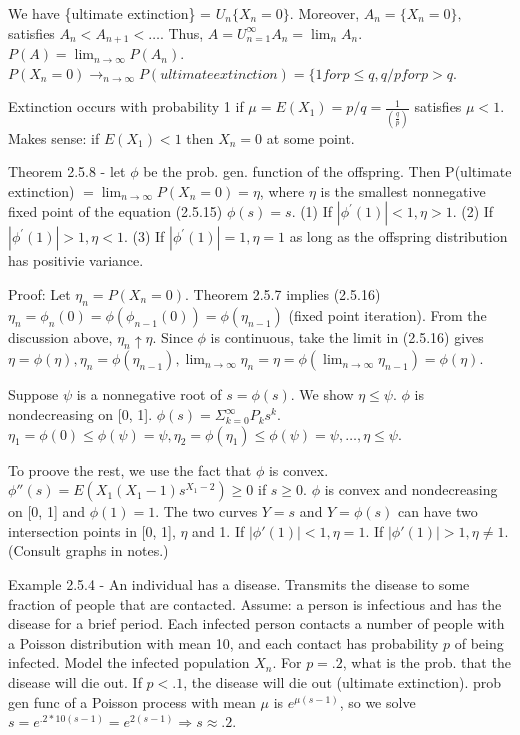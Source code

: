 \documentclass{article}
\begin{document}
We have \{ultimate extinction\} = $U_n \{X_n = 0\}$. Moreover, $A_n = \{X_n=0\},$ satisfies $A_n < A_{n+1} < \dots$. Thus, $A = U_{n=1}^{\infty} A_n = \lim_n A_n$. $P(A) = \lim_{n \rightarrow \infty} P(A_n)$. $P(X_n=0) \rightarrow_{n \rightarrow \infty} P(ultimate extinction) = \{ 1 for p \le q, q/p for p > q$.

Extinction occurs with probability 1 if $\mu = E(X_1) = p/q = \frac{1}{(\frac{q}{p})}$ satisfies $\mu < 1$. Makes sense: if $E(X_1) < 1$ then $X_n = 0$ at some point.

Theorem 2.5.8 - let $\phi$ be the prob. gen. function of the offspring. Then P(ultimate extinction) $= \lim_{n \rightarrow \infty} P(X_n = 0) = \eta$, where $\eta$ is the smallest nonnegative fixed point of the equation (2.5.15) $\phi(s) = s$. (1) If $|\phi^\prime (1)| < 1, \eta > 1$. (2) If $|\phi^\prime(1)| > 1, \eta < 1$. (3) If $|\phi^\prime(1)| = 1, \eta = 1$ as long as the offspring distribution has positivie variance.

Proof: Let $\eta_n = P(X_n=0)$. Theorem 2.5.7 implies (2.5.16) $\eta_n = \phi_n(0) = \phi(\phi_{n-1}(0)) = \phi(\eta_{n-1})$ (fixed point iteration). From the discussion above, $\eta_n \uparrow \eta$. Since $\phi$ is continuous, take the limit in (2.5.16) gives $\eta = \phi(\eta), \eta_n = \phi(\eta_{n-1}), \lim_{n \rightarrow \infty} \eta_n = \eta = \phi(\lim_{n \rightarrow \infty} \eta_{n-1}) = \phi(\eta)$.

Suppose $\psi$ is a nonnegative root of $s = \phi(s)$. We show $\eta \le \psi$. $\phi$ is nondecreasing on [0, 1]. $\phi(s) = \Sigma_{k=0}^{\infty} P_k s^k$. $\eta_1 = \phi(0) \le \phi(\psi) = \psi, \eta_2 = \phi(\eta_1) \le \phi(\psi) = \psi, \dots, \eta \le \psi$.

To proove the rest, we use the fact that $\phi$ is convex. $\phi''(s) = E(X_1(X_1-1)s^{X_1-2}) \ge 0$ if $s \ge 0$. $\phi$ is convex and nondecreasing on [0, 1] and $\phi(1) = 1$. The two curves $Y=s$ and $Y=\phi(s)$ can have two intersection points in [0, 1], $\eta$ and 1. If $|\phi'(1)| < 1, \eta = 1$. If $|\phi'(1)| > 1, \eta \ne 1$. (Consult graphs in notes.)

Example 2.5.4 - An individual has a disease. Transmits the disease to some fraction of people that are contacted. Assume: a person is infectious and has the disease for a brief period. Each infected person contacts a number of people with a Poisson distribution with mean 10, and each contact has probability $p$ of being infected. Model the infected population $X_n$. For $p = .2$, what is the prob. that the disease will die out. If $p < .1$, the disease will die out (ultimate extinction). prob gen func of a Poisson process with mean $\mu$ is $e^{\mu(s-1)}$, so we solve $s = e^{.2*10(s-1)} = e^{2(s-1)} \Rightarrow s \approx .2$.
\end{document}
